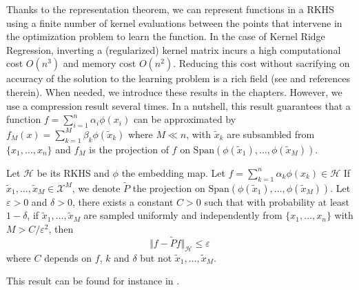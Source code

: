 Thanks to the representation theorem, we can represent functions in a RKHS using a finite number of kernel evaluations between the points that intervene in the optimization problem to learn the function. In the case of Kernel Ridge Regression, inverting a (regularized) kernel matrix incurs a high computational cost $O(n^3)$ and memory cost $O(n^2)$. Reducing this cost without sacrifying on accuracy of the solution to the learning problem is a rich field (see \cite{blanchard,rudi2015less,falkon} and references therein). When needed, we introduce these results in the chapters. However, we use a compression result several times. In a nutshell, this result guarantees that a function $f=\sum_{i=1}^n\alpha_i\phi(x_i)$ can be approximated by $f_M(x) = \sum_{k=1}^M \beta_k \phi(\tilde x_k)$ where $M \ll n$, with $\tilde x_k$ are subsambled from $\lbrace x_1, \ldots, x_n\rbrace$ and $f_M$ is the projection of $f$ on $\mathrm{Span}\left(\phi(\tilde x_1), \ldots, \phi(\tilde x_M)\right)$.

\begin{mdframed}
\begin{proposition}
Let $\mathcal H$ be its RKHS and $\phi$ the embedding map. Let $f = \sum_{k=1}^n\alpha_k \phi(x_k) \in\mathcal H$
If $\tilde x_1, \ldots, \tilde x_M \in \mathcal X^M$, we denote $\tilde P$ the projection on $\mathrm{Span}\left(\phi(\tilde x_1), \ldots, \phi(\tilde x_M)\right)$. Let $\varepsilon > 0$ and $\delta > 0$, there exists a constant $C > 0$ such that with probability at least $1-\delta$, if $\tilde x_1, \ldots, \tilde x_M$ are sampled uniformly and independently from $\lbrace x_1, \ldots, x_n\rbrace$ with $M > C / \varepsilon^2 $, then
\begin{equation}
    \Vert f - \tilde Pf \Vert_\mathcal H \leq \varepsilon
\end{equation}
where $C$ depends on $f$, $k$ and $\delta$ but not $\tilde x_1, \ldots, \tilde x_M$.
\end{proposition}
\end{mdframed}

This result can be found for instance in \cite{rudi2015less}.
